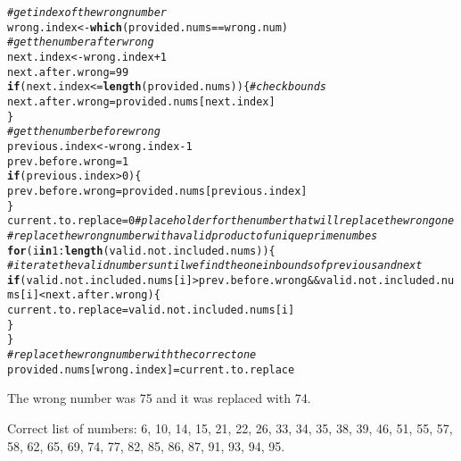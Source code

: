 \documentclass{article}\usepackage[]{graphicx}\usepackage[]{xcolor}
\makeatletter
\newcommand{\hlnum}[1]{\textcolor[rgb]{0.686,0.059,0.569}{#1}}%
\newcommand{\hlcom}[1]{\textcolor[rgb]{0.678,0.584,0.686}{\textit{#1}}}%
\newcommand{\hlopt}[1]{\textcolor[rgb]{0,0,0}{#1}}%
\newcommand{\hldef}[1]{\textcolor[rgb]{0.345,0.345,0.345}{#1}}%
\newcommand{\hlkwa}[1]{\textcolor[rgb]{0.161,0.373,0.58}{\textbf{#1}}}%
\newcommand{\hlkwb}[1]{\textcolor[rgb]{0.69,0.353,0.396}{#1}}%
\newcommand{\hlkwd}[1]{\textcolor[rgb]{0.737,0.353,0.396}{\textbf{#1}}}%
\newenvironment{kframe}{%
 \def\at@end@of@kframe{}%
 \ifinner\ifhmode%
  \def\at@end@of@kframe{\end{minipage}}%
  \begin{minipage}{\columnwidth}%
 \fi\fi%
 \def\FrameCommand##1{\hskip\@totalleftmargin \hskip-\fboxsep
 \colorbox{shadecolor}{##1}\hskip-\fboxsep
     \hskip-\linewidth \hskip-\@totalleftmargin \hskip\columnwidth}%
 \MakeFramed {\advance\hsize-\width
   \@totalleftmargin\z@ \linewidth\hsize
   \@setminipage}}%
 {\par\unskip\endMakeFramed%
 \at@end@of@kframe}
\newenvironment{knitrout}{}{} %
\makeatother
\begin{document}
\begin{enumerate}
\begin{knitrout}
\begin{kframe}
\begin{alltt}
\hlcom{#get index of the wrong number}
\hldef{wrong.index} \hlkwb{<-} \hlkwd{which}\hldef{(provided.nums}\hlopt{==}\hldef{wrong.num)}
\hlcom{#get the number after wrong }
\hldef{next.index} \hlkwb{<-} \hldef{wrong.index}\hlopt{+}\hlnum{1}
\hldef{next.after.wrong} \hlkwb{=} \hlnum{99}
\hlkwa{if} \hldef{(next.index} \hlopt{<=} \hlkwd{length}\hldef{(provided.nums))\{} \hlcom{#check bounds}
  \hldef{next.after.wrong} \hlkwb{=} \hldef{provided.nums[next.index]}
\hldef{\}}
\hlcom{#get the number before wrong}
\hldef{previous.index} \hlkwb{<-} \hldef{wrong.index}\hlopt{-}\hlnum{1}
\hldef{prev.before.wrong} \hlkwb{=} \hlnum{1}
\hlkwa{if} \hldef{(previous.index} \hlopt{>} \hlnum{0}\hldef{)\{}
  \hldef{prev.before.wrong} \hlkwb{=} \hldef{provided.nums[previous.index]}
\hldef{\}}
\hldef{current.to.replace} \hlkwb{=} \hlnum{0} \hlcom{#placeholder for the number that will replace the wrong one}
\hlcom{#replace the wrong number with a valid product of unique prime numbes}
\hlkwa{for} \hldef{(i} \hlkwa{in} \hlnum{1}\hlopt{:}\hlkwd{length}\hldef{(valid.not.included.nums))\{}
  \hlcom{#iterate the valid numbers until we find the one in bounds of previous and next}
  \hlkwa{if} \hldef{(valid.not.included.nums[i]} \hlopt{>} \hldef{prev.before.wrong} \hlopt{&&} \hldef{valid.not.included.nums[i]} \hlopt{<} \hldef{next.after.wrong)\{}
    \hldef{current.to.replace} \hlkwb{=} \hldef{valid.not.included.nums[i]}
  \hldef{\}}
\hldef{\}}
\hlcom{#replace the wrong number with the correct one}
\hldef{provided.nums[wrong.index]} \hlkwb{=} \hldef{current.to.replace}
\end{alltt}
\end{kframe}
\end{knitrout}
The wrong number was 75 and it was replaced with 74.

Correct list of numbers: 6, 10, 14, 15, 21, 22, 26, 33, 34, 35, 38, 39, 46, 51, 55, 57, 58, 62, 65, 69, 74, 77, 82, 85, 86, 87, 91, 93, 94, 95.
\end{enumerate}


\end{document}
